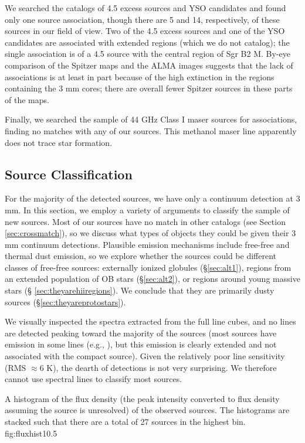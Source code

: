 \documentclass[twocolumn]{aastex61}
\begin{document}
We searched the \citet{Yusef-Zadeh2009a} catalogs of 4.5 \um excess sources and
YSO candidates and found only one source association, though there are 5 and
14, respectively, of these sources in our field of view.  Two of the 4.5 \um
excess sources and one of the YSO candidates are associated with extended \hii
regions (which we do not catalog); the single association is of a 4.5 \um source with the central region
of Sgr B2 M. By-eye comparison of the Spitzer maps and the ALMA images suggests
that the lack of associations is at least in part because of the high
extinction in the regions containing the 3 mm cores; there are overall fewer
Spitzer sources in these parts of the maps.

Finally, we searched the \citet{Mehringer1997a} sample of 44 GHz Class I \methanol
maser sources for associations, finding no matches with any
of our sources.  This methanol maser line apparently does not trace star
formation.


\subsection{Source Classification}
\label{sec:classification}
For the majority of the detected sources, we have only a continuum detection at
3 mm.    In this section, we employ a variety of arguments to classify the
sample of new sources.  Most of our sources have no match in other catalogs
(see Section \ref{sec:crossmatch}), so we discuss what types of objects they
could be given their 3 mm continuum detections.  Plausible emission mechanisms
include free-free and thermal dust emission, so we explore whether the sources
could be different classes of free-free sources: externally ionized
globules (\S \ref{sec:alt1}), \hii regions from an extended population of
OB stars (\S \ref{sec:alt2}), or \hii regions around young massive stars (\S
\ref{sec:theyarehiiregions}).  We conclude that they are
primarily dusty sources (\S \ref{sec:theyareprotostars}).

We visually inspected the spectra extracted from the full line cubes, and no
lines are detected peaking toward the majority of the sources (most sources
have emission in some lines (e.g., \cyanoacetylene), but this emission is
clearly extended and not associated with the compact source).  Given the
relatively poor line sensitivity (RMS $\approx 6$ K), the dearth of detections
is not very surprising.  We therefore cannot use spectral lines to classify
most sources.


{A histogram of the flux density (the peak intensity converted to flux density
assuming the source is unresolved) of the observed sources. 
The histograms are stacked such that there are a total of 27 sources in the
highest bin.
}
{fig:fluxhist}{1}{0.5\textwidth}
\end{document}
